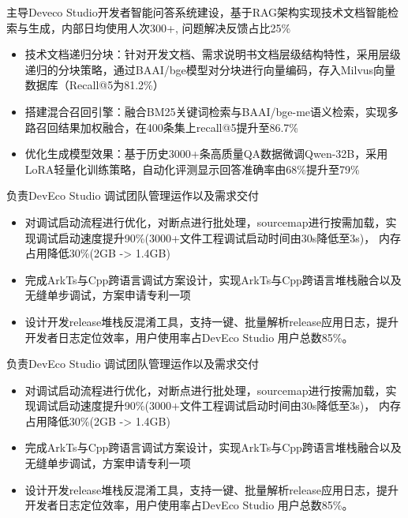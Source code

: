 \documentclass{resume}
\begin{document}
\begin{onehalfspacing}
主导Deveco Studio开发者智能问答系统建设，基于RAG架构实现技术文档智能检索与生成，内部日均使用人次300+, 问题解决反馈占比25\%
\begin{itemize}
  \item 技术文档递归分块：针对开发文档、需求说明书文档层级结构特性，采用层级递归的分块策略，通过BAAI/bge模型对分块进行向量编码，存入Milvus向量数据库（Recall@5为81.2\%）
  \item 搭建混合召回引擎：融合BM25关键词检索与BAAI/bge-me语义检索，实现多路召回结果加权融合，在400条集上recall@5提升至86.7\%
  \item 优化生成模型效果：基于历史3000+条高质量QA数据微调Qwen-32B，采用LoRA轻量化训练策略，自动化评测显示回答准确率由68\%提升至79\%
\end{itemize}

\begin{onehalfspacing}
负责DevEco Studio 调试团队管理运作以及需求交付
\begin{itemize}
  \item 对调试启动流程进行优化，对断点进行批处理，sourcemap进行按需加载，实现调试启动速度提升90\%(3000+文件工程调试启动时间由30s降低至3s)， 内存占用降低30\%(2GB -> 1.4GB)
  \item 完成ArkTs与Cpp跨语言调试方案设计，实现ArkTs与Cpp跨语言堆栈融合以及无缝单步调试，方案申请专利一项
  \item 设计开发release堆栈反混淆工具，支持一键、批量解析release应用日志，提升开发者日志定位效率，用户使用率占DevEco Studio 用户总数85\%。
\end{itemize}
\end{onehalfspacing}

\begin{onehalfspacing}
负责DevEco Studio 调试团队管理运作以及需求交付
\begin{itemize}
  \item 对调试启动流程进行优化，对断点进行批处理，sourcemap进行按需加载，实现调试启动速度提升90\%(3000+文件工程调试启动时间由30s降低至3s)， 内存占用降低30\%(2GB -> 1.4GB)
  \item 完成ArkTs与Cpp跨语言调试方案设计，实现ArkTs与Cpp跨语言堆栈融合以及无缝单步调试，方案申请专利一项
  \item 设计开发release堆栈反混淆工具，支持一键、批量解析release应用日志，提升开发者日志定位效率，用户使用率占DevEco Studio 用户总数85\%。
\end{itemize}
\end{onehalfspacing}


\end{onehalfspacing}
\end{document}
